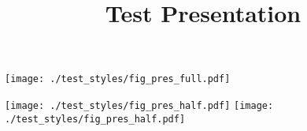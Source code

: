 \documentclass[xcolor=dvipsnames]{beamer}
\title{Test Presentation}
\begin{document}
\frame[plain]{\titlepage}

\begin{frame}[plain]
  \texttt{[image: ./test\_styles/fig\_pres\_full.pdf]}
\end{frame}
%   

\begin{frame}
  \texttt{[image: ./test\_styles/fig\_pres\_half.pdf]}
  \texttt{[image: ./test\_styles/fig\_pres\_half.pdf]}
\end{frame}
\end{document}
